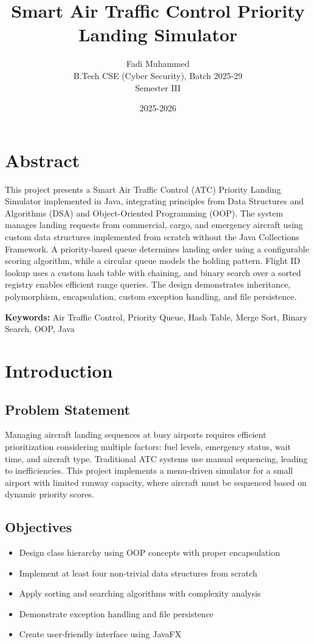 \documentclass[12pt,a4paper]{article}
\title{Smart Air Traffic Control Priority Landing Simulator}
\author{Fadi Muhammed\\B.Tech CSE (Cyber Security), Batch 2025-29\\Semester III}
\date{2025-2026}
\begin{document}
\maketitle

\section{Abstract}

This project presents a Smart Air Traffic Control (ATC) Priority Landing Simulator implemented in Java, integrating principles from Data Structures and Algorithms (DSA) and Object-Oriented Programming (OOP). The system manages landing requests from commercial, cargo, and emergency aircraft using custom data structures implemented from scratch without the Java Collections Framework. A priority-based queue determines landing order using a configurable scoring algorithm, while a circular queue models the holding pattern. Flight ID lookup uses a custom hash table with chaining, and binary search over a sorted registry enables efficient range queries. The design demonstrates inheritance, polymorphism, encapsulation, custom exception handling, and file persistence.

\textbf{Keywords:} Air Traffic Control, Priority Queue, Hash Table, Merge Sort, Binary Search, OOP, Java

\section{Introduction}

\subsection{Problem Statement}

Managing aircraft landing sequences at busy airports requires efficient prioritization considering multiple factors: fuel levels, emergency status, wait time, and aircraft type. Traditional ATC systems use manual sequencing, leading to inefficiencies. This project implements a menu-driven simulator for a small airport with limited runway capacity, where aircraft must be sequenced based on dynamic priority scores.

\subsection{Objectives}

\begin{itemize}
    \item Design class hierarchy using OOP concepts with proper encapsulation
    \item Implement at least four non-trivial data structures from scratch
    \item Apply sorting and searching algorithms with complexity analysis
    \item Demonstrate exception handling and file persistence
    \item Create user-friendly interface using JavaFX
\end{itemize}
\end{document}
